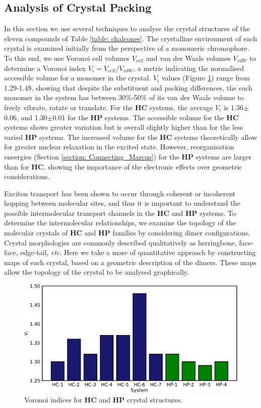 \subsection{Analysis of Crystal Packing} \label{section: Connecting_Motifs}
In this section we use several techniques to analyse the crystal structures of the eleven compounds of Table \ref{table: chalcones}. The crystalline environment of each crystal is examined initially from the perspective of a monomeric chromophore. To this end, we use Voronoi cell volumes $V_{cell}$ and van der Waals volumes $V_{vdW}$ to determine a Voronoi index $V_{i}=V_{cell}/V_{vdW}$, a metric indicating the normalised accessible volume for a monomer in the crystal. $V_{i}$ values (Figure \ref{figure: voronoi_index}) range from 1.29-1.48, showing that despite the substituent and packing differences, the each monomer in the system has between 30\%-50\% of its van der Waals volume to freely vibrate, rotate or translate. For the \textbf{HC} systems, the average $V_{i}$ is 1.36$\pm$0.06, and 1.30$\pm$0.01 for the \textbf{HP} systems. The accessible volume for the \textbf{HC} systems shows greater variation but is overall slightly higher than for the less varied \textbf{HP} systems. The increased volume for the \textbf{HC} systems theoretically allow for greater nuclear relaxation in the excited state. However, reorganisation eneergies (Section \ref{section: Connecting_Marcus}) for the \textbf{HP} systems are larger than for \textbf{HC}, showing the importance of the electronic effects over geometric considerations. 

Exciton transport has been shown to occur through coherent or incoherent hopping between molecular sites, and thus it is important to understand the possible intermolecular transport channels in the \textbf{HC} and \textbf{HP} systems. To determine the intermolecular relationships, we examine the topology of the molecular crystals of \textbf{HC} and \textbf{HP} families by considering dimer configurations. Crystal morphologies are commonly described qualitatively as herringbone, face-face, edge-tail, \textit{etc}. Here we take a more of quantitative approach by constructing maps of each crystal, based on a geometric description of the dimers. These maps allow the topology of the crystal to be analysed graphically.
\begin{figure}[t]
\centering
  \includegraphics[width=0.8\linewidth]{5ConnectingCrystalStructure/Voronoi_Index}
  \caption{Voronoi indices for \textbf{HC} and \textbf{HP} crystal structures.}
  \label{figure: voronoi_index}
\end{figure}

